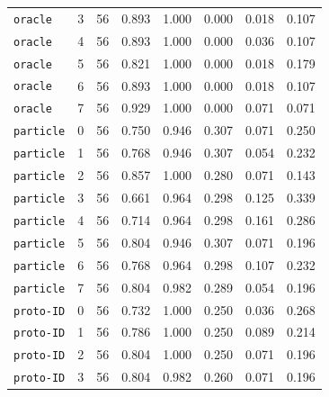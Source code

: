 \documentclass{article}
\begin{document}
\begin{center}
{\begin{tabular}{lllccccc}
\texttt{oracle} & 3 & 56 & 0.893 & 1.000 & 0.000 & 0.018 & 0.107 \\
\texttt{oracle} & 4 & 56 & 0.893 & 1.000 & 0.000 & 0.036 & 0.107 \\
\texttt{oracle} & 5 & 56 & 0.821 & 1.000 & 0.000 & 0.018 & 0.179 \\
\texttt{oracle} & 6 & 56 & 0.893 & 1.000 & 0.000 & 0.018 & 0.107 \\
\texttt{oracle} & 7 & 56 & 0.929 & 1.000 & 0.000 & 0.071 & 0.071 \\
\texttt{particle} & 0 & 56 & 0.750 & 0.946 & 0.307 & 0.071 & 0.250 \\
\texttt{particle} & 1 & 56 & 0.768 & 0.946 & 0.307 & 0.054 & 0.232 \\
\texttt{particle} & 2 & 56 & 0.857 & 1.000 & 0.280 & 0.071 & 0.143 \\
\texttt{particle} & 3 & 56 & 0.661 & 0.964 & 0.298 & 0.125 & 0.339 \\
\texttt{particle} & 4 & 56 & 0.714 & 0.964 & 0.298 & 0.161 & 0.286 \\
\texttt{particle} & 5 & 56 & 0.804 & 0.946 & 0.307 & 0.071 & 0.196 \\
\texttt{particle} & 6 & 56 & 0.768 & 0.964 & 0.298 & 0.107 & 0.232 \\
\texttt{particle} & 7 & 56 & 0.804 & 0.982 & 0.289 & 0.054 & 0.196 \\
\texttt{proto-ID} & 0 & 56 & 0.732 & 1.000 & 0.250 & 0.036 & 0.268 \\
\texttt{proto-ID} & 1 & 56 & 0.786 & 1.000 & 0.250 & 0.089 & 0.214 \\
\texttt{proto-ID} & 2 & 56 & 0.804 & 1.000 & 0.250 & 0.071 & 0.196 \\
\texttt{proto-ID} & 3 & 56 & 0.804 & 0.982 & 0.260 & 0.071 & 0.196 \\
\bottomrule
\end{tabular}%
}
\end{center}
\end{document}
